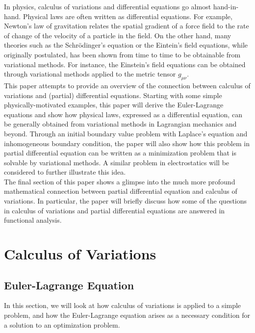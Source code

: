 \documentclass{article}
\begin{document}
In physics, calculus of variations and differential equations go almost hand-in-hand. Physical laws are often written as differential equations. For example, Newton's law of gravitation relates the spatial gradient of a force field to the rate of change of the velocity of a particle in the field. On the other hand, many theories such as the Schr\"{o}dinger's equation or the Eintein's field equations, while originally postulated, has been shown from time to time to be obtainable from variational methods. For instance, the Einstein's field equations can be obtained through variational methods applied to the metric tensor $g_{\mu\nu}$. \\


This paper attempts to provide an overview of the connection between calculus of variations and (partial) differential equations. Starting with some simple  physically-motivated examples, this paper will derive the Euler-Lagrange equations and show how physical laws, expressed as a differential equation, can be generally obtained from variational methods in Lagrangian mechanics and beyond. Through an initial boundary value problem with Laplace's equation and inhomogeneous boundary condition, the paper will also show how this problem in partial differential equation can be written as a minimization problem that is solvable by variational methods. A similar problem in electrostatics will be considered to further illustrate this idea. \\

The final section of this paper shows a glimpse into the much more profound mathematical connection between partial differential equation and calculus of variations. In particular, the paper will briefly discuss how some of the questions in calculus of variations and partial differential equations are answered in functional analysis.  


\section{Calculus of Variations}
\subsection{Euler-Lagrange Equation}

In this section, we will look at how calculus of variations is applied to a simple problem, and how the Euler-Lagrange equation arises as a necessary condition for a solution to an optimization problem. \\
\end{document}
